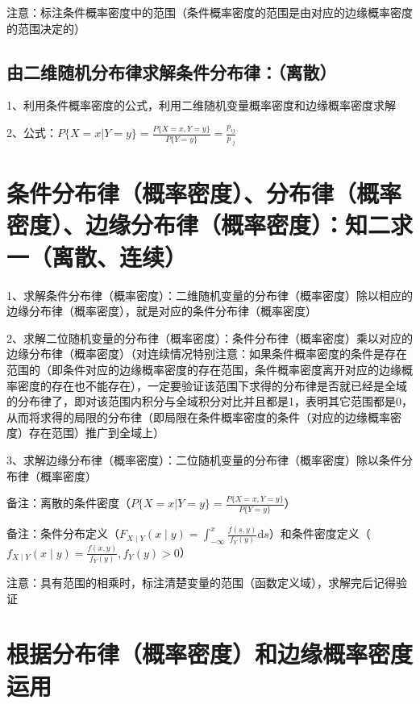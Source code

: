 注意：标注条件概率密度中的范围（条件概率密度的范围是由对应的边缘概率密度的范围决定的）



\subsection{由二维随机分布律求解条件分布律：（离散）}

1、利用条件概率密度的公式，利用二维随机变量概率密度和边缘概率密度求解

2、公式：$P\{X=x|Y=y\} = \frac {P\{X=x,Y=y\}}{P\{Y=y\}} = \frac {p_{ij}}{p_{\cdot j}}$



\section{条件分布律（概率密度）、分布律（概率密度）、边缘分布律（概率密度）：知二求一（离散、连续）}

1、求解条件分布律（概率密度）：二维随机变量的分布律（概率密度）除以相应的边缘分布律（概率密度），就是对应的条件分布律（概率密度）

2、求解二位随机变量的分布律（概率密度）：条件分布律（概率密度）乘以对应的边缘分布律（概率密度）（对连续情况特别注意：如果条件概率密度的条件是存在范围的（即条件对应的边缘概率密度的存在范围，条件概率密度离开对应的边缘概率密度的存在也不能存在），一定要验证该范围下求得的分布律是否就已经是全域的分布律了，即对该范围内积分与全域积分对比并且都是1，表明其它范围都是0，从而将求得的局限的分布律（即局限在条件概率密度的条件（对应的边缘概率密度）存在范围）推广到全域上）

3、求解边缘分布律（概率密度）：二位随机变量的分布律（概率密度）除以条件分布律（概率密度）

备注：离散的条件密度（$P\{X=x|Y=y\} = \frac {P\{X=x,Y=y\}}{P\{Y=y\}}$）

备注：条件分布定义（$F_{X \mid Y}(x \mid y)=\int_{-\infty}^{x} \frac{f(s, y)}{f_{Y}(y)} \mathrm{d} s$）和条件密度定义（$f_{X \mid Y}(x \mid y)=\frac{f(x, y)}{f_{Y}(y)}, f_{Y}(y)>0$）

注意：具有范围的相乘时，标注清楚变量的范围（函数定义域），求解完后记得验证

\section{根据分布律（概率密度）和边缘概率密度运用}



